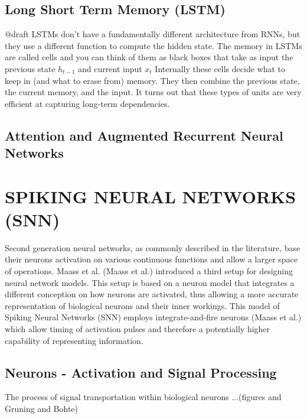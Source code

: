 \documentclass[letterpaper, 10 pt, conference]{ieeeconf}  %
\begin{document}
\subsection{Long Short Term Memory (LSTM)}

@draft 
LSTMs don’t have a fundamentally different architecture from RNNs, but they use a different 
function to compute the hidden state. The memory in LSTMs are called cells and you can think 
of them as black boxes that take as input the previous state $h_{t-1}$ and current input $x_{t}$
Internally these cells  decide what to keep in (and what to erase from) memory. They then 
combine the previous state, the current memory, and the input. It turns out that these types of 
units are very efficient at capturing long-term dependencies.

\subsection{Attention and Augmented Recurrent Neural Networks}


\section{SPIKING NEURAL NETWORKS (SNN)}

Second generation neural networks, as commonly described in the literature, base their neurons activation on various continuous functions 
and allow a larger space of operations. Maass et al. (Maass et al.) introduced a third setup for 
designing neural network models. This setup is based on a neuron model that integrates a different conception on how neurons are activated,
thus allowing a more accurate representation of biological neurons and their inner workings. This model of Spiking Neural Networks (SNN) employs
integrate-and-fire neurons (Maass et al.) which allow timing of activation pulses and therefore a potentially higher capability of representing 
information. 

\subsection{Neurons - Activation and Signal Processing} 

The process of signal transportation within biological neurons ...(figures and Gruning and Bohte)\newline
\end{document}
